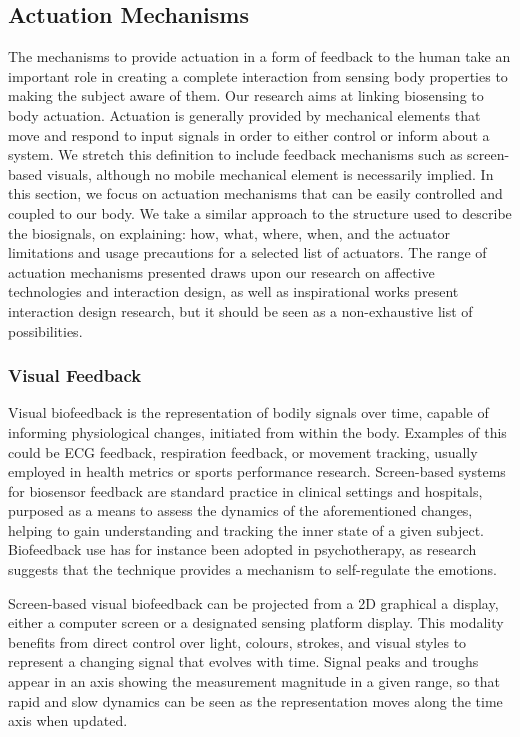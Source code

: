 \subsection{Actuation Mechanisms} 

The mechanisms to provide actuation in a form of feedback to the human take an important role in creating a complete interaction from sensing body properties to making the subject aware of them. Our research aims at linking biosensing to body actuation. Actuation is generally provided by mechanical elements that move and respond to input signals in order to either control or inform about a system. We stretch this definition to include feedback mechanisms such as screen-based visuals, although no mobile mechanical element is necessarily implied. In this section, we focus on actuation mechanisms that can be easily controlled and coupled to our body. We take a similar approach to the structure used to describe the biosignals, on explaining: how, what, where, when, and the actuator limitations and usage precautions for a selected list of actuators. The range of actuation mechanisms presented draws upon our research on affective technologies and interaction design, as well as inspirational works present interaction design research, but it should be seen as a non-exhaustive list of possibilities.

\subsubsection{Visual Feedback}

Visual biofeedback is the representation of bodily signals over time, capable of informing physiological changes, initiated from within the body. Examples of this could be ECG feedback, respiration feedback, or movement tracking, usually employed in health metrics or sports performance research. Screen-based systems for biosensor feedback are standard practice in clinical settings and hospitals, purposed as a means to assess the dynamics of the aforementioned changes, helping to gain understanding and tracking the inner state of a given subject. Biofeedback use has for instance been adopted in psychotherapy, as research suggests that the technique provides a mechanism to self-regulate the emotions. 

Screen-based visual biofeedback can be projected from a 2D graphical a display, either a computer screen or a designated sensing platform display. This modality benefits from direct control over light, colours, strokes, and visual styles to represent a changing signal that evolves with time. Signal peaks and troughs appear in an axis showing the measurement magnitude in a given range, so that rapid and slow dynamics can be seen as the representation moves along the time axis when updated. 

